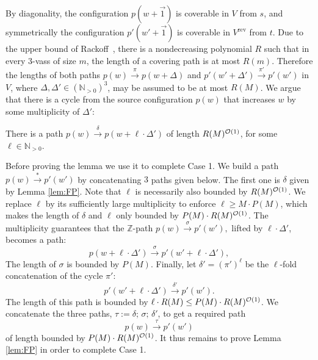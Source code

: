 \documentclass[a4paper, UKenglish, cleveref, autoref, thm-restate]{lipics-v2021}
\newcommand{\N}{\mathbb{N}}
\newcommand{\Z}{\mathbb{Z}}
\newcommand{\trans}[1]{\stackrel{#1}{\longrightarrow}}
\newcommand{\tran}{\trans{*}}
\renewcommand{\vec}[1]{\overrightarrow{#1}}
\newcommand{\OO}{{\cal O}}
\newcommand{\vass}{{\sc vass}\xspace}
\newcommand{\tvass}{\parvass 3}
\newcommand{\parvass}[1]{{$#1$-\vass}\xspace}
\newcommand{\rev}[1]{{#1}^{\text{rev}}}
\newcommand{\Npos}{\N_{>0}}
\begin{document}
By diagonality, the configuration $p(w+\vec 1)$ is coverable in $V$ from $s$,
and symmetrically the configuration $p'(w' + \vec 1)$ is coverable in $\rev V$ from $t$.
Due to the upper bound of 
Rackoff~\cite[Lemma~3.4]{DBLP:journals/tcs/Rackoff78},
there is a nondecreasing polynomial $R$ such that in every \tvass of size $m$, the length of a covering
path is at most $R(m)$.
Therefore the lengths of 
both paths $p(w) \trans {\pi} p(w+\Delta)$  and $p'(w'+\Delta')\trans {\pi'} p'(w')$ in $V$, 
where $\Delta, \Delta' \in (\Npos)^3$,
may be assumed to be at most $R(M)$.
We argue that there is a cycle 
from the source configuration $p(w)$ 
that increases $w$ by some multiplicity of $\Delta'$:
\begin{lemma} \label{lem:FP}
There is a path $p(w) \trans \delta p(w+ \ell \cdot\Delta')$ of length $R(M)^{\OO(1)}$,
for some $\ell\in\Npos$.
\end{lemma}
Before proving the lemma we use it to complete Case 1.
We build a path $p(w) \tran p'(w')$ by concatenating $3$ paths given below.
The first one is  $\delta$
given by Lemma \ref{lem:FP}.
Note that $\ell$ is necessarily also bounded by $R(M)^{\OO(1)}$.
We replace $\ell$ by its sufficiently large multiplicity to enforce $\ell \geq M\cdot P(M)$, which
makes the length of $\delta$ and $\ell$ only bounded by $P(M) \cdot R(M)^{\OO(1)}$.
The multiplicity guarantees that the $\Z$-path 
$
p(w) \trans{\sigma} p'(w'), 
$
lifted by $\ell \cdot \Delta'$, becomes a path:
\[
p(w+\ell \cdot \Delta') \trans{\sigma} p'(w' + \ell\cdot\Delta'), 
\]
The length of $\sigma$ is bounded by $P(M)$.
Finally, let $\delta' = (\pi')^\ell$ be the $\ell$-fold concatenation of
the cycle $\pi'$:
\[
p'(w'+\ell\cdot\Delta') \trans{\delta'} p'(w').
\]
The length of this path is bounded by $\ell\cdot R(M) \leq P(M)\cdot R(M)^{\OO(1)}$.
We concatenate the three paths, $\tau := \delta; \, \sigma;\, \delta'$, to get a required path
\[
p(w) \trans{\tau} p'(w')
\]
of length bounded by $P(M) \cdot R(M)^{\OO(1)}$.
It thus remains to prove Lemma \ref{lem:FP} in order to complete Case 1.
\end{document}

